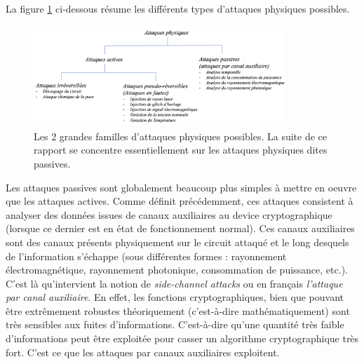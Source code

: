 \documentclass[10pt, oneside, a4paper]{article}
\begin{document}
\vspace{-0.3 cm}La figure \ref{fig:attaques} ci-dessous résume les différents types d'attaques physiques possibles.
\begin{figure}[htbp]
    \centering
    \includegraphics[width=0.85\textwidth]{image/attaques}
    \caption{Les 2 grandes familles d'attaques physiques possibles. La suite de ce rapport se concentre essentiellement sur les attaques physiques dites passives.}
    \label{fig:attaques}
\end{figure}

\vspace{-0.25 cm}Les attaques passives sont globalement beaucoup plus simples à mettre en oeuvre que les attaques actives. Comme définit précédemment, ces attaques consistent à analyser des données issues de canaux auxiliaires au device cryptographique (lorsque ce dernier est en état de fonctionnement normal). Ces canaux auxiliaires sont des canaux présents physiquement sur le circuit attaqué et le long desquels de l’information s’échappe (sous différentes formes : rayonnement électromagnétique, rayonnement photonique, consommation de puissance, etc.). C'est là qu'intervient la notion de \textit{side-channel attacks} ou en français \textit{l'attaque par canal auxiliaire}. 
En effet, les fonctions cryptographiques, bien que pouvant être extrêmement robustes théoriquement (c'est-à-dire mathématiquement) sont très sensibles aux fuites d’informations. C'est-à-dire qu'une quantité très faible d’informations peut être exploitée pour casser un algorithme cryptographique très fort. C’est ce que les attaques par canaux auxiliaires exploitent. 
\end{document}
